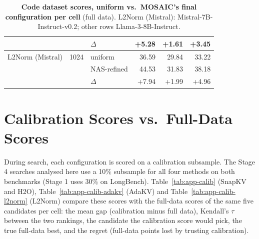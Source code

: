 \begin{table}[tp]
\begin{tabular}{@{}l r l r r r @{}}
     &  & $\Delta$ & +5.28 & +1.61 & +3.45 \\
    \midrule
    L2Norm (Mistral) & 1024 & uniform & 36.59 & 29.84 & 33.22 \\
     &  & NAS-refined & 44.53 & 31.83 & 38.18 \\
     &  & $\Delta$ & +7.94 & +1.99 & +4.96 \\
    \bottomrule
  \end{tabular}
  \caption{\textbf{Code dataset scores, uniform vs.\ MOSAIC's final configuration per cell} (full data). L2Norm (Mistral): Mistral-7B-Instruct-v0.2; other rows Llama-3-8B-Instruct.}
  \label{tab:app-lb-CODE}
\end{table}


\FloatBarrier


\section{Calibration Scores vs.\ Full-Data Scores}
\label{app:calib}

During search, each configuration is scored on a calibration subsample. The Stage 4 searches analysed here use a 10\% subsample for all four methods on both benchmarks (Stage 1 uses 30\% on LongBench). Table~\ref{tab:app-calib} (SnapKV and H2O), Table~\ref{tab:app-calib-adakv} (AdaKV) and Table~\ref{tab:app-calib-l2norm} (L2Norm) compare these scores with the full-data scores of the same five candidates per cell: the mean gap (calibration minus full data), Kendall's $\tau$ between the two rankings, the candidate the calibration score would pick, the true full-data best, and the regret (full-data points lost by trusting calibration).

